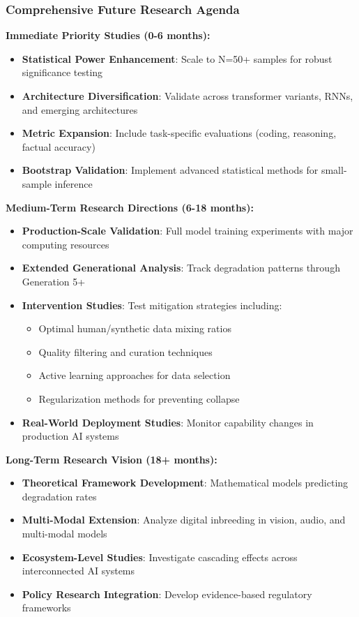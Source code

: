 \documentclass{article}
\begin{document}
\subsubsection{Comprehensive Future Research Agenda}

\textbf{Immediate Priority Studies (0-6 months):}
\begin{itemize}
    \item \textbf{Statistical Power Enhancement}: Scale to N=50+ samples for robust significance testing
    \item \textbf{Architecture Diversification}: Validate across transformer variants, RNNs, and emerging architectures
    \item \textbf{Metric Expansion}: Include task-specific evaluations (coding, reasoning, factual accuracy)
    \item \textbf{Bootstrap Validation}: Implement advanced statistical methods for small-sample inference
\end{itemize}

\textbf{Medium-Term Research Directions (6-18 months):}
\begin{itemize}
    \item \textbf{Production-Scale Validation}: Full model training experiments with major computing resources
    \item \textbf{Extended Generational Analysis}: Track degradation patterns through Generation 5+
    \item \textbf{Intervention Studies}: Test mitigation strategies including:
    \begin{itemize}
        \item Optimal human/synthetic data mixing ratios
        \item Quality filtering and curation techniques
        \item Active learning approaches for data selection
        \item Regularization methods for preventing collapse
    \end{itemize}
    \item \textbf{Real-World Deployment Studies}: Monitor capability changes in production AI systems
\end{itemize}

\textbf{Long-Term Research Vision (18+ months):}
\begin{itemize}
    \item \textbf{Theoretical Framework Development}: Mathematical models predicting degradation rates
    \item \textbf{Multi-Modal Extension}: Analyze digital inbreeding in vision, audio, and multi-modal models
    \item \textbf{Ecosystem-Level Studies}: Investigate cascading effects across interconnected AI systems
    \item \textbf{Policy Research Integration}: Develop evidence-based regulatory frameworks
\end{itemize}
\end{document}
